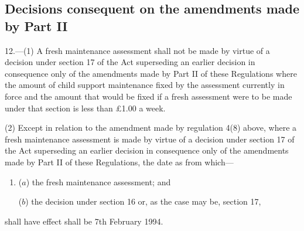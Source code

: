 \documentclass[12pt,a4paper]{article}
\begin{document}

%
%
%

\subsection[12. Decisions consequent on the amendments made by Part II]{Decisions consequent on the amendments made by Part II}

12.—(1) A fresh maintenance assessment shall not be made by virtue of a decision under section 17 of the Act superseding an earlier decision in consequence only of the amendments made by Part II of these Regulations where the amount of child support maintenance fixed by the assessment currently in force and the amount that would be fixed if a fresh assessment were to be made under that section is less than £1.00 a week.

(2) Except in relation to the amendment made by regulation 4(8) above, where a fresh maintenance assessment is made by virtue of a decision under section 17 of the Act superseding an earlier decision in consequence only of the amendments made by Part II of these Regulations, the date as from which—
\begin{enumerate}\item[]
($a$) the fresh maintenance assessment; and

($b$) the decision under section 16 or, as the case may be, section 17,
\end{enumerate}
shall have effect shall be 7th February 1994.
\end{document}
